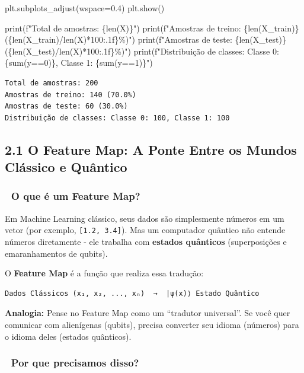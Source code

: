 \documentclass[
  brazilian,
]{report}
\newenvironment{Shaded}{\begin{snugshade}}{\end{snugshade}}
\newcommand{\NormalTok}[1]{\textcolor[rgb]{0.00,0.23,0.31}{#1}}
\begin{document}
\begin{Shaded}
\begin{Highlighting}[]
\NormalTok{plt.subplots\_adjust(wspace=0.4)}
\NormalTok{plt.show()}

\NormalTok{print(f"Total de amostras: \{len(X)\}")}
\NormalTok{print(f"Amostras de treino: \{len(X\_train)\} (\{len(X\_train)/len(X)*100:.1f\}\%)")}
\NormalTok{print(f"Amostras de teste: \{len(X\_test)\} (\{len(X\_test)/len(X)*100:.1f\}\%)")}
\NormalTok{print(f"Distribuição de classes: Classe 0: \{sum(y==0)\}, Classe 1: \{sum(y==1)\}")}
\end{Highlighting}
\end{Shaded}

\begin{verbatim}
Total de amostras: 200
Amostras de treino: 140 (70.0%)
Amostras de teste: 60 (30.0%)
Distribuição de classes: Classe 0: 100, Classe 1: 100
\end{verbatim}

\subsection{2.1 O Feature Map: A Ponte Entre os Mundos Clássico e
Quântico}\label{o-feature-map-a-ponte-entre-os-mundos-cluxe1ssico-e-quuxe2ntico}

\subsubsection{🌉 O que é um Feature
Map?}\label{o-que-uxe9-um-feature-map}

Em Machine Learning clássico, seus dados são simplesmente números em um
vetor (por exemplo, \texttt{{[}1.2,\ 3.4{]}}). Mas um computador
quântico não entende números diretamente - ele trabalha com
\textbf{estados quânticos} (superposições e emaranhamentos de qubits).

O \textbf{Feature Map} é a função que realiza essa tradução:

\begin{verbatim}
Dados Clássicos (x₁, x₂, ..., xₙ)  →  |ψ(x)⟩ Estado Quântico
\end{verbatim}

\textbf{Analogia:} Pense no Feature Map como um ``tradutor universal''.
Se você quer comunicar com alienígenas (qubits), precisa converter seu
idioma (números) para o idioma deles (estados quânticos).

\subsubsection{🔬 Por que precisamos
disso?}\label{por-que-precisamos-disso}
\end{document}
